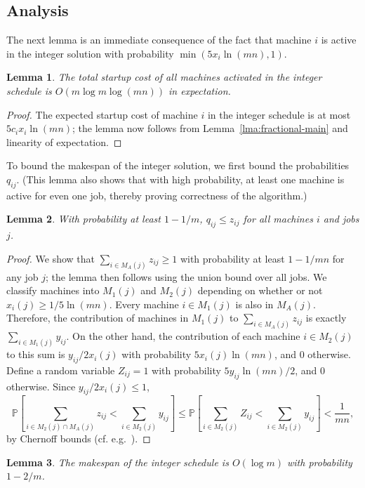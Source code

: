 \documentclass[11pt]{article}
\newcommand{\pr}{{\mathbb{P}}}
\newtheorem{lemma}{Lemma}
\begin{document}
\subsection{Analysis}
The next lemma is an immediate consequence of the fact that machine 
$i$ is active in the integer solution with probability
$\min(5x_i\ln (mn), 1)$.
\begin{lemma}
\label{lma:cost-integer}
The total startup cost of all machines activated in the integer
schedule is $O(m \log m\log (mn))$ in expectation.
\end{lemma}
\begin{proof}
The expected startup cost of machine $i$ in the integer schedule 
is at most $5c_i x_i\ln (mn)$;
the lemma now follows from Lemma~\ref{lma:fractional-main} and
linearity of expectation.
\end{proof}
\noindent
To bound the makespan of the integer solution, we first bound the probabilities $q_{ij}$.
(This lemma also shows that with high probability, at least one machine is active for even
one job, thereby proving correctness of the algorithm.)
\begin{lemma}
\label{lma:open}
With probability at least $1 - 1/m$, $q_{ij} \leq z_{ij}$ for all machines $i$ and jobs $j$.
\end{lemma}
\begin{proof}
We show that $\sum_{i\in M_A(j)} z_{ij} \geq 1$ with probability at least $1 - 1/mn$
for any job $j$; the lemma then follows using the union bound over all jobs. 
We classify machines into $M_1(j)$ and $M_2(j)$ depending on whether or not 
$x_i(j) \geq 1/5 \ln (mn)$. Every machine $i\in M_1(j)$ is also in $M_A(j)$. Therefore, 
the contribution of machines in $M_1(j)$
to $\sum_{i\in M_A(j)} z_{ij}$ is exactly $\sum_{i\in M_1(j)} y_{ij}$. On 
the other hand, the contribution of each machine $i\in M_2(j)$ to this sum
is $y_{ij}/2x_i(j)$ with probability $5 x_i(j)\ln (mn)$, and 0 otherwise. Define
a random variable $Z_{ij} = 1$ with probability $5 y_{ij} \ln (mn)/2$, and 0 otherwise. 
Since $y_{ij}/2 x_i(j)\leq 1$,
\begin{equation*}
\pr\left[\sum_{i\in M_2(j) \cap M_A(j)} z_{ij} < \sum_{i\in M_2(j)} y_{ij}\right]
\leq \pr\left[\sum_{i\in M_2(j)} Z_{ij} < \sum_{i\in M_2(j)} y_{ij}\right]
< \frac{1}{mn},
\end{equation*} 
by Chernoff bounds (cf. e.g.~\cite{MotwaniR97}). 
\end{proof}
\noindent
\begin{lemma}
\label{lma:load-whp}
The makespan of the integer schedule is $O(\log m)$ with probability $1 - 2/m$.
\end{lemma}
\end{document}
